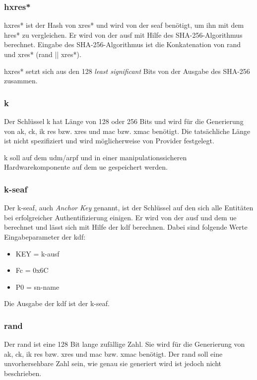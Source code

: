 \subsubsection{\gls{hxres*}}
\gls{hxres*} ist der Hash von \gls{xres*} und wird von der \gls{seaf} benötigt, um ihn mit dem \gls{hres*} zu vergleichen.
Er wird von der \gls{ausf} mit Hilfe des SHA-256-Algorithmus berechnet. %
Eingabe des SHA-256-Algorithmus ist die Konkatenation von \gls{rand} und \gls{xres*} (\gls{rand} || \gls{xres*}).

\gls{hxres*} setzt sich aus den 128 \textit{least significant} Bits von der Ausgabe des SHA-256 zusammen.

\subsubsection{\gls{k}}
Der Schlüssel \gls{k} hat Länge von 128 oder 256 Bits und wird für die Generierung von \gls{ak}, \gls{ck}, \gls{ik} \gls{res} bzw. \gls{xres} und \gls{mac} bzw. \gls{xmac} benötigt. %
Die tatsächliche Länge ist nicht spezifiziert und wird möglicherweise von Provider festgelegt. %

\gls{k} soll auf dem \gls{udm}/\gls{arpf} und in einer manipulationssicheren Hardwarekomponente auf dem \gls{ue} gespeichert werden.  %

\subsubsection{\gls{k-seaf}}
Der \gls{k-seaf}, auch \textit{Anchor Key} genannt, ist der Schlüssel auf den sich alle Entitäten bei erfolgreicher Authentifizierung einigen. %
Er wird von der \gls{ausf} und dem \gls{ue} berechnet und lässt sich mit Hilfe der \gls{kdf} berechnen.
Dabei sind folgende Werte Eingabeparameter der \gls{kdf}: %
\begin{itemize}
\item KEY = \gls{k-ausf}
\item Fc = 0x6C
\item P0 = \gls{sn-name}
\end{itemize}
Die Ausgabe der \gls{kdf} ist der \gls{k-seaf}.

\subsubsection{\gls{rand}}
Der \gls{rand} ist eine 128 Bit lange zufällige Zahl. %
Sie wird für die Generierung von \gls{ak}, \gls{ck}, \gls{ik} \gls{res} bzw. \gls{xres} und \gls{mac} bzw. \gls{xmac} benötigt. 
Der \gls{rand} soll eine unvorhersehbare Zahl sein, wie genau sie generiert wird ist jedoch nicht beschrieben. %

